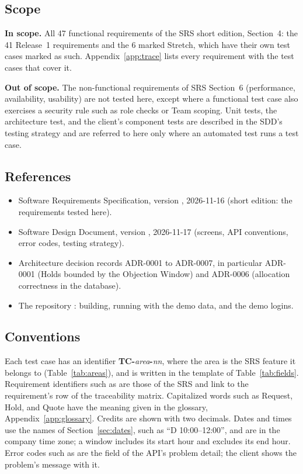 \subsection{Scope}\label{sec:scope}
\textbf{In scope.} All 47 functional requirements of the SRS short edition, Section~4: the 41 Release~1 requirements and the 6 marked Stretch, which have their own test cases marked as such. Appendix~\ref{app:trace} lists every requirement with the test cases that cover it.

\textbf{Out of scope.} The non-functional requirements of SRS Section~6 (performance, availability, usability) are not tested here, except where a functional test case also exercises a security rule such as role checks or Team scoping. Unit tests, the architecture test, and the client's component tests are described in the SDD's testing strategy and are referred to here only where an automated test runs a test case.

\subsection{References}
\begin{itemize}
  \item \SRSproduct{} Software Requirements Specification, version \SRSversion, 2026-11-16 (short edition: the requirements tested here).
  \item \SRSproduct{} Software Design Document, version \SDDversion, 2026-11-17 (screens, API conventions, error codes, testing strategy).
  \item Architecture decision records ADR-0001 to ADR-0007, in particular ADR-0001 (Holds bounded by the Objection Window) and ADR-0006 (allocation correctness in the database).
  \item The  repository : building, running with the demo data, and the demo logins.
\end{itemize}

\subsection{Conventions}\label{sec:conventions}
Each test case has an identifier \textbf{TC-}\textit{area}\textbf{-}\textit{nn}, where the area is the SRS feature it belongs to (Table~\ref{tab:areas}), and is written in the template of Table~\ref{tab:fields}. Requirement identifiers such as  are those of the SRS and link to the requirement's row of the traceability matrix. Capitalized words such as Request, Hold, and Quote have the meaning given in the glossary, Appendix~\ref{app:glossary}. Credits are shown with two decimals. Dates and times use the names of Section~\ref{sec:dates}, such as ``D 10:00--12:00'', and are in the company time zone; a window includes its start hour and excludes its end hour. Error codes such as  are the  field of the API's problem detail; the client shows the problem's message with it.

